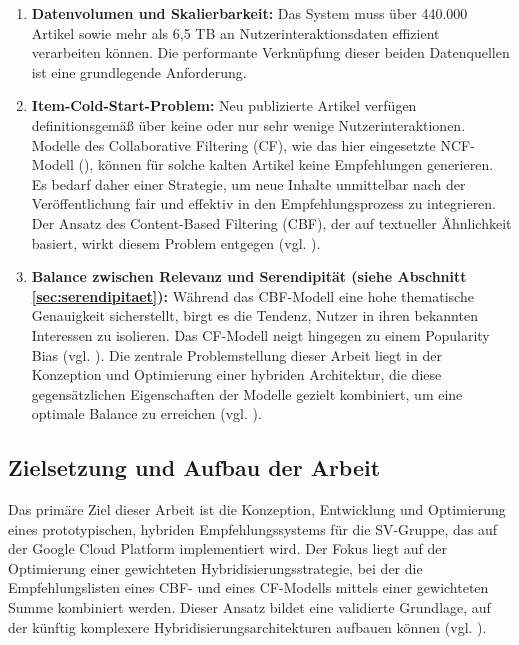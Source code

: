 \begin{enumerate}
    \item \textbf{Datenvolumen und Skalierbarkeit:} Das System muss über 440.000 Artikel sowie mehr als 6,5 TB 
    an Nutzerinteraktionsdaten effizient verarbeiten können. Die performante Verknüpfung dieser beiden Datenquellen 
    ist eine grundlegende Anforderung.
    
    \item \textbf{Item-Cold-Start-Problem:} Neu publizierte Artikel verfügen definitionsgemäß über keine 
    oder nur sehr wenige Nutzerinteraktionen. Modelle des Collaborative Filtering (CF), wie das hier eingesetzte \ac{NCF}-Modell (\cite{he_neural_2017}), 
    können für solche kalten Artikel keine Empfehlungen generieren. Es bedarf daher einer Strategie, 
    um neue Inhalte unmittelbar nach der Veröffentlichung fair und effektiv in den Empfehlungsprozess zu integrieren. 
    Der Ansatz des Content-Based Filtering (CBF), der auf textueller Ähnlichkeit basiert, wirkt diesem Problem entgegen (vgl. \cite{Lops_CBRS_SOTA_2011}).
    
    \item \textbf{Balance zwischen Relevanz und Serendipität (siehe Abschnitt \ref{sec:serendipitaet}):} Während das CBF-Modell eine hohe thematische Genauigkeit 
    sicherstellt, birgt es die Tendenz, Nutzer in ihren bekannten Interessen zu isolieren. 
    Das CF-Modell neigt hingegen zu einem Popularity Bias (vgl. \cite{Abdollahpouri_Popularity_Bias_2019}). Die zentrale Problemstellung dieser Arbeit liegt in der 
    Konzeption und Optimierung einer hybriden Architektur, die diese gegensätzlichen Eigenschaften der Modelle gezielt 
    kombiniert, um eine optimale Balance zu erreichen (vgl. \cite{Kotkov_Serendipity_2016}).
\end{enumerate}

\subsection{Zielsetzung und Aufbau der Arbeit}
\label{sec:zielsetzung}
Das primäre Ziel dieser Arbeit ist die Konzeption, Entwicklung und Optimierung eines prototypischen, 
hybriden Empfehlungssystems für die \ac{SV-Gruppe}, das auf der Google Cloud Platform implementiert wird. 
Der Fokus liegt auf der Optimierung einer gewichteten Hybridisierungsstrategie, bei der die Empfehlungslisten 
eines \ac{CBF}- und eines \ac{CF}-Modells mittels einer gewichteten Summe 
kombiniert werden. Dieser Ansatz bildet eine validierte Grundlage, auf der künftig komplexere 
Hybridisierungsarchitekturen aufbauen können (vgl. \cite{burke_hybrid_2002}).

